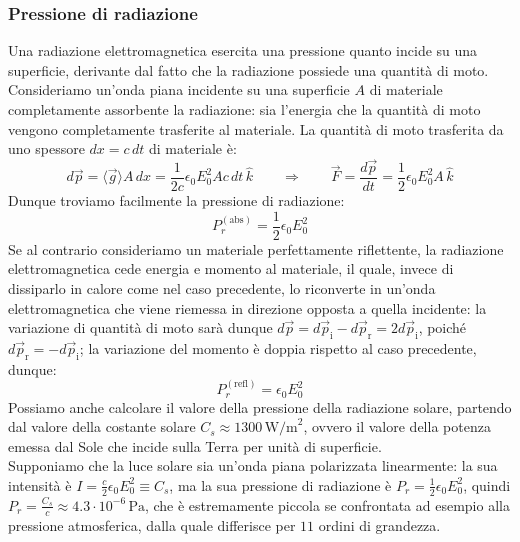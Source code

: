 \subsubsection{Pressione di radiazione}

Una radiazione elettromagnetica esercita una pressione quanto incide su una superficie, derivante dal fatto che la radiazione possiede una quantità di moto. \\ 
%
Consideriamo un'onda piana incidente su una superficie $ A $ di materiale completamente assorbente la radiazione: sia l'energia che la quantità di moto vengono completamente trasferite al materiale. La quantità di moto trasferita da uno spessore $ dx = c\,dt $ di materiale è:
\begin{equation}
	d\vec{p} = \langle \vec{g} \rangle A \,dx = \frac{1}{2c} \epsilon_0 E_0^2 A c \,dt \, \hat{k} \qquad\Longrightarrow\qquad \vec{F} = \frac{d\vec{p}}{dt} = \frac{1}{2} \epsilon_0 E_0^2 A \,\hat{k}
	\label{eq:44}
\end{equation}
Dunque troviamo facilmente la pressione di radiazione:
\begin{equation}
	P_r^{(\text{abs})} = \frac{1}{2} \epsilon_0 E_0^2
	\label{eq:45}
\end{equation}
%
Se al contrario consideriamo un materiale perfettamente riflettente, la radiazione elettromagnetica cede energia e momento al materiale, il quale, invece di dissiparlo in calore come nel caso precedente, lo riconverte in un'onda elettromagnetica che viene riemessa in direzione opposta a quella incidente: la variazione di quantità di moto sarà dunque $ d\vec{p} = d\vec{p}_{\text{i}} - d\vec{p}_{\text{r}} = 2 d\vec{p}_{\text{i}} $, poiché $ d\vec{p}_{\text{r}} = -d\vec{p}_{\text{i}} $; la variazione del momento è doppia rispetto al caso precedente, dunque:
\begin{equation}
	P_r^{(\text{refl})} = \epsilon_0 E_0^2
	\label{eq:46}
\end{equation}
%
Possiamo anche calcolare il valore della pressione della radiazione solare, partendo dal valore della costante solare $ C_s \approx 1300 \,\text{W/m}^2 $, ovvero il valore della potenza emessa dal Sole che incide sulla Terra per unità di superficie. \\ 
Supponiamo che la luce solare sia un'onda piana polarizzata linearmente: la sua intensità è $ I = \frac{c}{2} \epsilon_0 E_0^2 \equiv C_s $, ma la sua pressione di radiazione è $ P_r = \frac{1}{2} \epsilon_0 E_0^2 $, quindi $ P_r = \frac{C_s}{c} \approx 4.3 \cdot 10^{-6} \,\text{Pa} $, che è estremamente piccola se confrontata ad esempio alla pressione atmosferica, dalla quale differisce per $ 11 $ ordini di grandezza.


